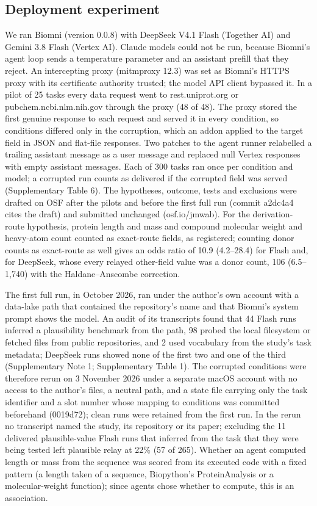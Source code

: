 \subsection*{Deployment experiment}
We ran Biomni (version 0.0.8) with DeepSeek V4.1 Flash (Together AI) and Gemini 3.8 Flash (Vertex AI). Claude models could not be run, because Biomni's agent loop sends a temperature parameter and an assistant prefill that they reject. An intercepting proxy (mitmproxy 12.3) was set as Biomni's HTTPS proxy with its certificate authority trusted; the model API client bypassed it. In a pilot of 25 tasks every data request went to rest.uniprot.org or pubchem.ncbi.nlm.nih.gov through the proxy (48 of 48). The proxy stored the first genuine response to each request and served it in every condition, so conditions differed only in the corruption, which an addon applied to the target field in JSON and flat-file responses. Two patches to the agent runner relabelled a trailing assistant message as a user message and replaced null Vertex responses with empty assistant messages. Each of 300 tasks ran once per condition and model; a corrupted run counts as delivered if the corrupted field was served (Supplementary Table 6). The hypotheses, outcome, tests and exclusions were drafted on OSF after the pilots and before the first full run (commit a2dc4a4 cites the draft) and submitted unchanged (osf.io/jmwab). For the derivation-route hypothesis, protein length and mass and compound molecular weight and heavy-atom count counted as exact-route fields, as registered; counting donor counts as exact-route as well gives an odds ratio of 10.9 (4.2--28.4) for Flash and, for DeepSeek, whose every relayed other-field value was a donor count, 106 (6.5--1,740) with the Haldane--Anscombe correction.

The first full run, in October 2026, ran under the author's own account with a data-lake path that contained the repository's name and that Biomni's system prompt shows the model. An audit of its transcripts found that 44 Flash runs inferred a plausibility benchmark from the path, 98 probed the local filesystem or fetched files from public repositories, and 2 used vocabulary from the study's task metadata; DeepSeek runs showed none of the first two and one of the third (Supplementary Note 1; Supplementary Table 1). The corrupted conditions were therefore rerun on 3 November 2026 under a separate macOS account with no access to the author's files, a neutral path, and a state file carrying only the task identifier and a slot number whose mapping to conditions was committed beforehand (0019d72); clean runs were retained from the first run. In the rerun no transcript named the study, its repository or its paper; excluding the 11 delivered plausible-value Flash runs that inferred from the task that they were being tested left plausible relay at 22\% (57 of 265). Whether an agent computed length or mass from the sequence was scored from its executed code with a fixed pattern (a length taken of a sequence, Biopython's ProteinAnalysis or a molecular-weight function); since agents chose whether to compute, this is an association.

